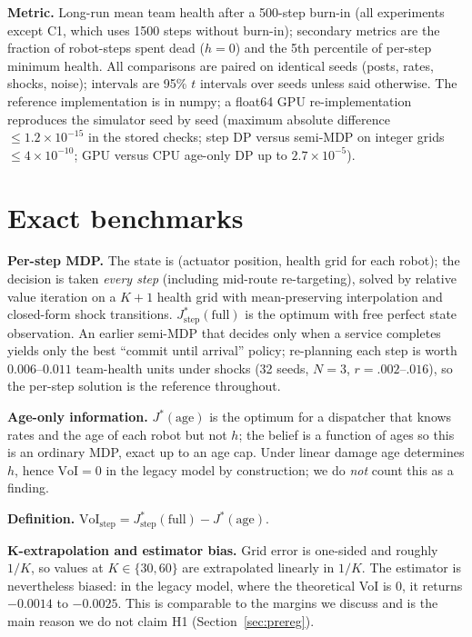 \documentclass[10pt]{article}
\begin{document}
\textbf{Metric.} Long-run mean team health after a 500-step burn-in (all experiments except C1, which uses 1500 steps without burn-in); secondary metrics are the fraction of robot-steps spent dead ($h=0$) and the 5th percentile of per-step minimum health. All comparisons are paired on identical seeds (posts, rates, shocks, noise); intervals are 95\% $t$ intervals over seeds unless said otherwise. The reference implementation is in numpy; a float64 GPU re-implementation reproduces the simulator seed by seed (maximum absolute difference $\le1.2\times10^{-15}$ in the stored checks; step DP versus semi-MDP on integer grids $\le4\times10^{-10}$; GPU versus CPU age-only DP up to $2.7\times10^{-5}$).

\section{Exact benchmarks}\label{sec:bench}
\textbf{Per-step MDP.} The state is (actuator position, health grid for each robot); the decision is taken \emph{every step} (including mid-route re-targeting), solved by relative value iteration on a $K{+}1$ health grid with mean-preserving interpolation and closed-form shock transitions. $J^*_{\text{step}}(\text{full})$ is the optimum with free perfect state observation. An earlier semi-MDP that decides only when a service completes yields only the best ``commit until arrival'' policy; re-planning each step is worth $0.006$--$0.011$ team-health units under shocks (32 seeds, $N{=}3$, $r{=}.002$--$.016$), so the per-step solution is the reference throughout.

\textbf{Age-only information.} $J^*(\text{age})$ is the optimum for a dispatcher that knows rates and the age of each robot but not $h$; the belief is a function of ages so this is an ordinary MDP, exact up to an age cap. Under linear damage age determines $h$, hence $\mathrm{VoI}=0$ in the legacy model by construction; we do \emph{not} count this as a finding.

\textbf{Definition.} $\mathrm{VoI}_{\text{step}}=J^*_{\text{step}}(\text{full})-J^*(\text{age})$.

\textbf{K-extrapolation and estimator bias.} Grid error is one-sided and roughly $1/K$, so values at $K\in\{30,60\}$ are extrapolated linearly in $1/K$. The estimator is nevertheless biased: in the legacy model, where the theoretical VoI is $0$, it returns $-0.0014$ to $-0.0025$. This is comparable to the margins we discuss and is the main reason we do not claim H1 (Section~\ref{sec:prereg}).
\end{document}
